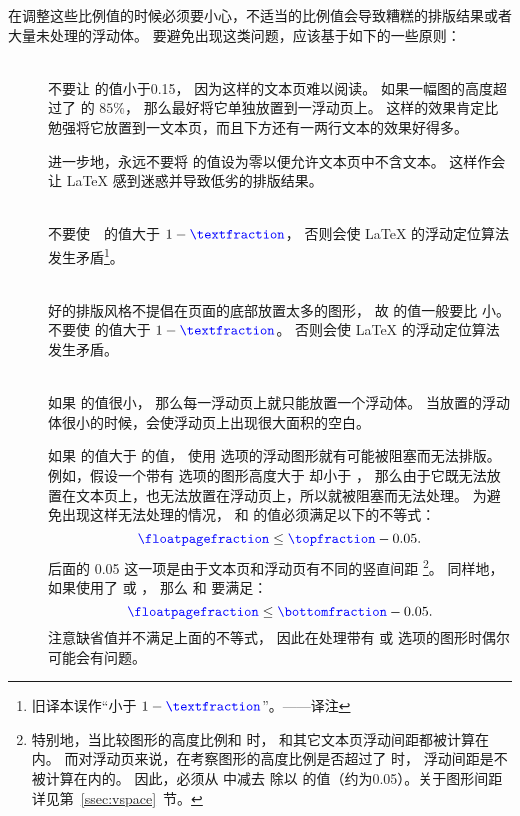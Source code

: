 在调整这些比例值的时候必须要小心，不适当的比例值会导致糟糕的排版结果或者大量未处理的浮动体。
要避免出现这类问题，应该基于如下的一些原则：
\begin{description}
	\item [] \mbox{} \\
	不要让  的值小于0.15，
	因为这样的文本页难以阅读。
	如果一幅图的高度超过了  的 $85\percent$，
	那么最好将它单独放置到一浮动页上。
	这样的效果肯定比勉强将它放置到一文本页，而且下方还有一两行文本的效果好得多。
	
	进一步地，永远不要将  的值设为零以便允许文本页中不含文本。
	这样作会让 \LaTeX{} 感到迷惑并导致低劣的排版结果。
	
	\item [] \mbox{} \\
	不要使~~的值大于 $1-\text{\cmd{textfraction}}$，
	否则会使 \LaTeX{} 的浮动定位算法发生矛盾\footnote{
		旧译本误作“小于 $1-\text{\cmd{textfraction}}$”。——译注}。
	
	\item [] \mbox{} \\
	好的排版风格不提倡在页面的底部放置太多的图形，
	故  的值一般要比  小。
	不要使  的值大于 $1-\text{\cmd{textfraction}}$。
	否则会使 \LaTeX{} 的浮动定位算法发生矛盾。
	
	\item [] \mbox{} \\
	如果  的值很小，
	那么每一浮动页上就只能放置一个浮动体。
	当放置的浮动体很小的时候，会使浮动页上出现很大面积的空白。
	
	如果  的值大于  的值，
	使用 \opt{[tp]} 选项的浮动图形就有可能被阻塞而无法排版。
	例如，假设一个带有 \opt{[tp]} 选项的图形高度大于  却小于 ，
	那么由于它既无法放置在文本页上，也无法放置在浮动页上，所以就被阻塞而无法处理。
	为避免出现这样无法处理的情况，
	 和  的值必须满足以下的不等式：
	\[
	\text{\cmd{floatpagefraction}} \leq \text{\cmd{topfraction}} - 0.05.
	\]
	后面的 0.05 这一项是由于文本页和浮动页有不同的竖直间距
	\footnote{特别地，当比较图形的高度比例和  时，
		 和其它文本页浮动间距都被计算在内。
		而对浮动页来说，在考察图形的高度比例是否超过了  时，
		浮动间距是不被计算在内的。
		因此，必须从  中减去  除以  的值（约为0.05）。关于图形间距详见第~\ref{ssec:vspace}~节。}。
	同样地，如果使用了 \opt{[bp]} 或 \opt{[hbp]}，
	那么  和  要满足：
	\[
	\text{\cmd{floatpagefraction}} \leq \text{\cmd{bottomfraction}} - 0.05.
	\]
	注意缺省值并不满足上面的不等式，
	因此在处理带有 \opt{[bp]} 或 \opt{[hbp]} 选项的图形时偶尔可能会有问题。
\end{description}

